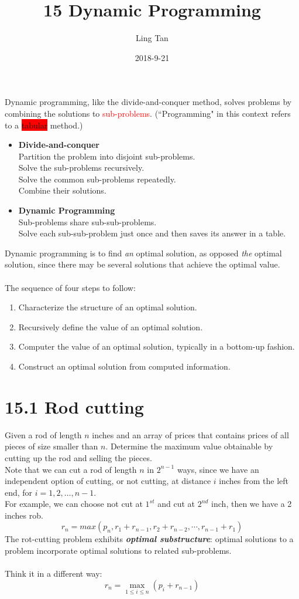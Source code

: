 \documentclass[a4paper]{article}
\title{15 Dynamic Programming}
\author{Ling Tan}
\date{2018-9-21}
\begin{document}
\maketitle

Dynamic programming, like the divide-and-conquer method, solves problems by combining the solutions to \textcolor{red}{sub-problems}. (``Programming" in this context refers to a \colorbox{red}{tabular} method.)
\begin{itemize}
    \item \textbf{Divide-and-conquer}\\
    Partition the problem into disjoint sub-problems.\\
    Solve the sub-problems recursively.\\
    Solve the common sub-problems repeatedly.\\
    Combine their solutions.
    \item \textbf{Dynamic Programming}\\
    Sub-problems share sub-sub-problems.\\
    Solve each sub-sub-problem just once and then saves its answer in a table.
\end{itemize}
Dynamic programming is to find \textit{an} optimal solution, as opposed \textit{the} optimal solution, since there may be several solutions that achieve the optimal value. 
\\
\\
The sequence of four steps to follow:
\begin{enumerate}
    \item Characterize the structure of an optimal solution.
    \item Recursively define the value of an optimal solution.
    \item Computer the value of an optimal solution, typically in a bottom-up fashion.
    \item Construct an optimal solution from computed information.
\end{enumerate}

\section*{15.1 Rod cutting}
Given a rod of length $n$ inches and an array of prices that contains prices of all pieces of size smaller than $n$. Determine the maximum value obtainable by cutting up the rod and selling the pieces.\\
Note that we can cut a rod of length $n$ in $2^{n-1}$ ways, since we have an independent option of cutting, or not cutting, at distance $i$ inches from the left end, for $i=1,2,\ldots, n-1$.\\ 
For example, we can choose not cut at $1^{st}$ and cut at $2^{nd}$ inch, then we have a 2 inches rob.
$$
r_n=max(p_n, r_1+r_{n-1}, r_2+r_{n-2},\cdots, r_{n-1}+r_{1})
$$
The rot-cutting problem exhibits \textbf{\textit{optimal substructure}}: optimal solutions to a problem incorporate optimal solutions to related sub-problems.\\
\\
Think it in a different way:
    $$r_n=\max_{1\leq i\leq n}(p_i+r_{n-1})$$
    
\end{document}
